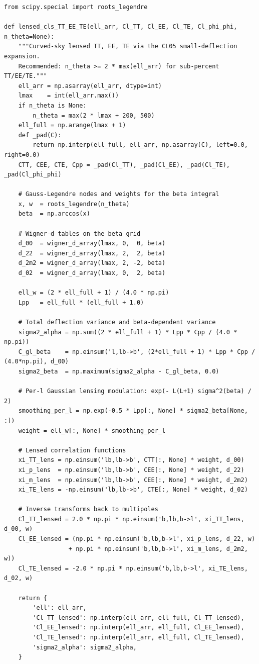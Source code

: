 \begin{codebox}
\begin{lstlisting}[style=python]
from scipy.special import roots_legendre

def lensed_cls_TT_EE_TE(ell_arr, Cl_TT, Cl_EE, Cl_TE, Cl_phi_phi, n_theta=None):
    """Curved-sky lensed TT, EE, TE via the CL05 small-deflection expansion.
    Recommended: n_theta >= 2 * max(ell_arr) for sub-percent TT/EE/TE."""
    ell_arr = np.asarray(ell_arr, dtype=int)
    lmax    = int(ell_arr.max())
    if n_theta is None:
        n_theta = max(2 * lmax + 200, 500)
    ell_full = np.arange(lmax + 1)
    def _pad(C):
        return np.interp(ell_full, ell_arr, np.asarray(C), left=0.0, right=0.0)
    CTT, CEE, CTE, Cpp = _pad(Cl_TT), _pad(Cl_EE), _pad(Cl_TE), _pad(Cl_phi_phi)

    # Gauss-Legendre nodes and weights for the beta integral
    x, w  = roots_legendre(n_theta)
    beta  = np.arccos(x)

    # Wigner-d tables on the beta grid
    d_00  = wigner_d_array(lmax, 0,  0, beta)
    d_22  = wigner_d_array(lmax, 2,  2, beta)
    d_2m2 = wigner_d_array(lmax, 2, -2, beta)
    d_02  = wigner_d_array(lmax, 0,  2, beta)

    ell_w = (2 * ell_full + 1) / (4.0 * np.pi)
    Lpp   = ell_full * (ell_full + 1.0)

    # Total deflection variance and beta-dependent variance
    sigma2_alpha = np.sum((2 * ell_full + 1) * Lpp * Cpp / (4.0 * np.pi))
    C_gl_beta    = np.einsum('l,lb->b', (2*ell_full + 1) * Lpp * Cpp / (4.0*np.pi), d_00)
    sigma2_beta  = np.maximum(sigma2_alpha - C_gl_beta, 0.0)

    # Per-l Gaussian lensing modulation: exp(- L(L+1) sigma^2(beta) / 2)
    smoothing_per_l = np.exp(-0.5 * Lpp[:, None] * sigma2_beta[None, :])
    weight = ell_w[:, None] * smoothing_per_l

    # Lensed correlation functions
    xi_TT_lens = np.einsum('lb,lb->b', CTT[:, None] * weight, d_00)
    xi_p_lens  = np.einsum('lb,lb->b', CEE[:, None] * weight, d_22)
    xi_m_lens  = np.einsum('lb,lb->b', CEE[:, None] * weight, d_2m2)
    xi_TE_lens = -np.einsum('lb,lb->b', CTE[:, None] * weight, d_02)

    # Inverse transforms back to multipoles
    Cl_TT_lensed = 2.0 * np.pi * np.einsum('b,lb,b->l', xi_TT_lens, d_00, w)
    Cl_EE_lensed = (np.pi * np.einsum('b,lb,b->l', xi_p_lens, d_22, w)
                  + np.pi * np.einsum('b,lb,b->l', xi_m_lens, d_2m2, w))
    Cl_TE_lensed = -2.0 * np.pi * np.einsum('b,lb,b->l', xi_TE_lens, d_02, w)

    return {
        'ell': ell_arr,
        'Cl_TT_lensed': np.interp(ell_arr, ell_full, Cl_TT_lensed),
        'Cl_EE_lensed': np.interp(ell_arr, ell_full, Cl_EE_lensed),
        'Cl_TE_lensed': np.interp(ell_arr, ell_full, Cl_TE_lensed),
        'sigma2_alpha': sigma2_alpha,
    }
\end{lstlisting}
\end{codebox}

